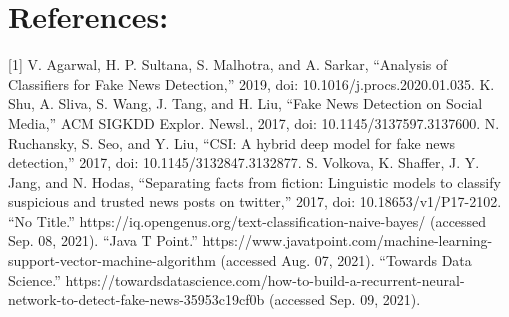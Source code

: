 \documentclass[12pt]{article}
\begin{document}
\section*{References:}

[1]	V. Agarwal, H. P. Sultana, S. Malhotra, and A. Sarkar, “Analysis of Classifiers for Fake News Detection,” 2019, doi: 10.1016/j.procs.2020.01.035.
\newline
[2]	K. Shu, A. Sliva, S. Wang, J. Tang, and H. Liu, “Fake News Detection on Social Media,” ACM SIGKDD Explor. Newsl., 2017, doi: 10.1145/3137597.3137600.
\newline
[3]	N. Ruchansky, S. Seo, and Y. Liu, “CSI: A hybrid deep model for fake news detection,” 2017, doi: 10.1145/3132847.3132877.
\newline
[4]	S. Volkova, K. Shaffer, J. Y. Jang, and N. Hodas, “Separating facts from fiction: Linguistic models to classify suspicious and trusted news posts on twitter,” 2017, doi: 10.18653/v1/P17-2102.
\newline
[5]	“No Title.” https://iq.opengenus.org/text-classification-naive-bayes/ (accessed Sep. 08, 2021).
\newline
[6]	“Java T Point.” https://www.javatpoint.com/machine-learning-support-vector-machine-algorithm (accessed Aug. 07, 2021).
\newline
[7]	“Towards Data Science.” https://towardsdatascience.com/how-to-build-a-recurrent-neural-network-to-detect-fake-news-35953c19cf0b (accessed Sep. 09, 2021).
\end{document}
